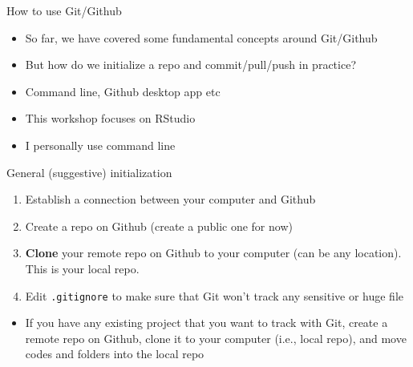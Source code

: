 \documentclass[handout,pdftex,10pt,aspectratio=169]{beamer}
\begin{document}
\begin{frame}{How to use Git/Github}
  \begin{itemize}[<+->]
    \item So far, we have covered some fundamental concepts around Git/Github
    \item But how do we initialize a repo and commit/pull/push in practice?
    \item Command line, Github desktop app etc
    \item This workshop focuses on RStudio
    \item I personally use command line
  \end{itemize}
\end{frame}


\begin{frame}{General (suggestive) initialization}
  \begin{enumerate}[<+->]
    \item Establish a connection between your computer and Github
    \item Create a repo on Github (create a public one for now)
    \item \textbf{Clone} your remote repo on Github to your computer (can be any location).
    This is your local repo.
    \item Edit \texttt{.gitignore} to make sure that Git won't track any sensitive or huge file
  \end{enumerate}
  \medskip
  \begin{itemize}[<+->]
    \item If you have any existing project that you want to track with Git, create a remote repo
    on Github, clone it to your computer (i.e., local repo), and move codes and folders into the local repo
  \end{itemize}
\end{frame}
\end{document}
